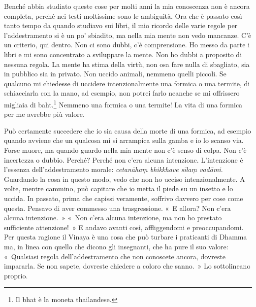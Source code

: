 Benché abbia studiato queste cose per molti anni la mia conoscenza non è
ancora completa, perché nei testi moltissime sono le ambiguità. Ora che
è passato così tanto tempo da quando studiavo sui libri, il mio ricordo
delle varie regole per l'addestramento si è un po' sbiadito, ma nella
mia mente non vedo mancanze. C'è un criterio, qui dentro. Non ci sono
dubbi, c'è comprensione. Ho messo da parte i libri e mi sono concentrato
a sviluppare la mente. Non ho dubbi a proposito di nessuna regola. La
mente ha stima della virtù, non osa fare nulla di sbagliato, sia in
pubblico sia in privato. Non uccido animali, nemmeno quelli piccoli. Se
qualcuno mi chiedesse di uccidere intenzionalmente una formica o una
termite, di schiacciarla con la mano, ad esempio, non potrei farlo
neanche se mi offrissero migliaia di baht.\footnote{Il bhat è la moneta
  thailandese.} Nemmeno una formica o una termite! La vita di una
formica per me avrebbe più valore.

Può certamente succedere che io sia causa della morte di una formica, ad
esempio quando avviene che un qualcosa mi si arrampica sulla gamba e io
lo scanso via. Forse muore, ma quando guardo nella mia mente non c'è
senso di colpa. Non c'è incertezza o dubbio. Perché? Perché non c'era
alcuna intenzione. L'intenzione è l'essenza dell'addestramento morale:
\emph{cetanāhaṃ bhikkhave sīlaṃ vadāmi}. Guardando la cosa in questo
modo, vedo che non ho ucciso intenzionalmente. A volte, mentre cammino,
può capitare che io metta il piede su un insetto e lo uccida. In
passato, prima che capissi veramente, soffrivo davvero per cose come
questa. Pensavo di aver commesso una trasgressione. «~E allora? Non
c'era alcuna intenzione.~» «~Non c'era alcuna intenzione, ma non ho
prestato sufficiente attenzione!~» E andavo avanti così, affliggendomi e
preoccupandomi. Per questa ragione il Vinaya è una cosa che può turbare
i praticanti di Dhamma ma, in linea con quello che dicono gli
insegnanti, che ha pure il suo valore: «~Qualsiasi regola
dell'addestramento che non conoscete ancora, dovreste impararla. Se non
sapete, dovreste chiedere a coloro che sanno.~» Lo sottolineano proprio.

